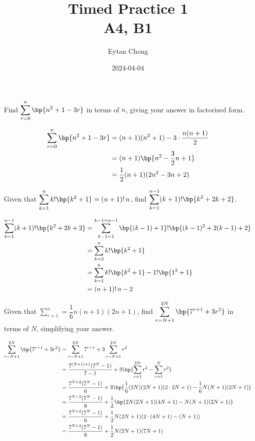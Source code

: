 \documentclass{echw}
\title{Timed Practice 1\\A4, B1}
\author{Eytan Chong}
\date{2024-04-04}
\begin{document}
    \problem{}
        Find $\displaystyle\sum\limits_{r = 0}^n \bp{n^2 + 1 - 3r}$ in terms of $n$, giving your answer in factorized form.

    \solution
        \begin{align*}
            \sum_{r = 0}^n \bp{n^2 + 1 - 3r} &= (n+1)(n^2 + 1) - 3 \cdot \dfrac{n(n+1)}2\\
            &= (n+1)\bp{n^2 - \dfrac32 n + 1}\\
            &= \dfrac12 (n+1)(2n^2 - 3n + 2)
        \end{align*}


    \problem{}
        Given that $\displaystyle\sum\limits_{k=1}^n k!\bp{k^2 + 1} = (n+1)!\,n$, find $\displaystyle\sum\limits_{k=1}^{n-1} (k+1)!\bp{k^2 + 2k + 2}$.

    \solution
        \begin{align*}
            \sum_{k=1}^{n-1} (k+1)!\bp{k^2 + 2k + 2} &= \sum_{k-1=1}^{k-1=n-1} \bp{(k-1)+1}!\bp{(k-1)^2 + 2(k-1) + 2}\\
            &= \sum_{k=2}^{n} k! \bp{k^2 + 1}\\
            &= \sum_{k=1}^{n} k! \bp{k^2 + 1} - 1! \bp{1^2 + 1}\\
            &= (n+1)! \, n - 2
        \end{align*}


    \problem{}
        Given that $\displaystyle\sum\limits_{r=1}^n = \dfrac16 n(n+1)(2n+1)$, find $\displaystyle\sum\limits_{r=N+1}^{2N} \bp{7^{r+1} + 3r^2}$ in terms of $N$, simplifying your answer.

    \solution
        \begin{align*}
            \sum_{r=N+1}^{2N} \bp{7^{r+1} + 3r^2} &= \sum_{r=N+1}^{2N} 7^{r+1} + 3\sum_{r=N+1}^{2N} r^2 \\
            &= \dfrac{7^{(N+1)+1}(7^N - 1)}{7-1} + 3\bp{\sum_{r=1}^{2N} r^2 - \sum_{r=1}^{N} r^2}\\
            &= \dfrac{7^{N+2}(7^N - 1)}{6} + 3\bp{\dfrac16 (2N)(2N+1)(2 \cdot 2N + 1) - \dfrac16 N(N+1)(2N+1)}\\
            &= \dfrac{7^{N+2}(7^N - 1)}{6} + \dfrac12\bp{2N(2N+1)(4N + 1) - N(N+1)(2N+1)}\\
            &= \dfrac{7^{N+2}(7^N - 1)}{6} + \dfrac12 N(2N+1)(2 \cdot (4N + 1) - (N+1))\\
            &= \dfrac{7^{N+2}(7^N - 1)}{6} + \dfrac12 N(2N+1)(7N+1)
        \end{align*}
\end{document}

